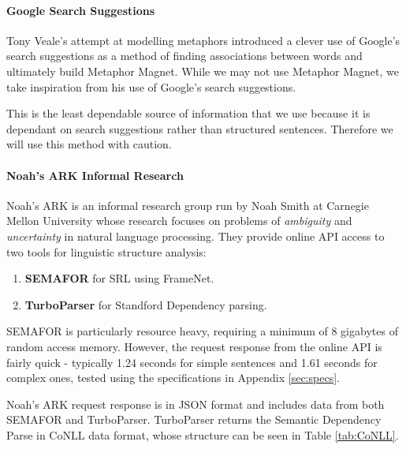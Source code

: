 \paragraph{Google Search Suggestions}
\label{sec:goog-sugg}
Tony Veale's attempt at modelling metaphors\cite{vealespecifying} introduced a clever use of Google's search suggestions as a method of finding associations between words and ultimately build Metaphor Magnet. While we may not use Metaphor Magnet, we take inspiration from his use of Google's search suggestions.

This is the least dependable source of information that we use because it is dependant on search suggestions rather than structured sentences. Therefore we will use this method with caution.

\paragraph{Noah's ARK Informal Research}
Noah's ARK is an informal research group run by Noah Smith at Carnegie Mellon University\cite{ark} whose research focuses on problems of \textit{ambiguity} and \textit{uncertainty} in natural language processing. They provide online API access to two tools for linguistic structure analysis:
\begin{enumerate}
\item{\textbf{SEMAFOR}\cite{chen2010semafor} for SRL using FrameNet.}
\item{\textbf{TurboParser}\cite{turboparser} for Standford Dependency parsing.}
\end{enumerate}   

SEMAFOR is particularly resource heavy, requiring a minimum of 8 gigabytes of random access memory. However, the request response from the online API is fairly quick - typically 1.24 seconds for simple sentences and 1.61 seconds for complex ones, tested using the specifications in Appendix \ref{sec:specs}.

Noah's ARK request response is in JSON format and includes data from both SEMAFOR and TurboParser. TurboParser returns the Semantic Dependency Parse in CoNLL data format, whose structure can be seen in Table \ref{tab:CoNLL}. 

